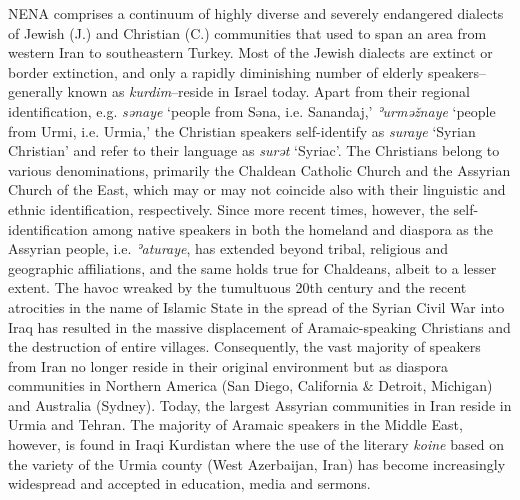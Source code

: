 \documentclass[output=paper,colorlinks,citecolor=brown,draftmode]{langscibook}
\begin{document}
NENA comprises a continuum of highly diverse and severely endangered dialects of Jewish (J.) and Christian (C.) communities that used to span an area from western Iran to southeastern Turkey. Most of the Jewish dialects are extinct or border extinction, and only a rapidly diminishing number of elderly speakers–generally known as \textit{kurdim}–reside in Israel today. Apart from their regional identification, e.g. \textit{sənaye} `people from Səna, i.e. Sanandaj,' \textit{ʾurməžnaye} `people from Urmi, i.e. Urmia,' the Christian speakers self-identify as \textit{suraye} `Syrian Christian' and refer to their language as \textit{surət} `Syriac'. The Christians belong to various denominations, primarily the Chaldean Catholic Church and the Assyrian Church of the East, which may or may not coincide also with their linguistic and ethnic identification, respectively. Since more recent times, however, the self-identification among  native speakers in both the homeland and diaspora as the Assyrian people, i.e. \textit{ʾaturaye}, has extended beyond tribal, religious and geographic affiliations, and the same holds true for Chaldeans, albeit to a lesser extent. The havoc wreaked by the tumultuous 20th century and the recent atrocities in the name of Islamic State in the spread of the Syrian Civil War into Iraq has resulted in the massive displacement of Aramaic-speaking Christians and the destruction of entire villages. Consequently, the vast majority of speakers from Iran no longer reside in their original environment but as diaspora communities in Northern America (San Diego, California \& Detroit, Michigan) and Australia (Sydney). Today, the largest Assyrian communities in Iran reside in Urmia and Tehran. The majority of Aramaic speakers in the Middle East, however, is found in Iraqi Kurdistan where the use of the literary \textit{koine} based on the variety of the Urmia county (West Azerbaijan, Iran) has become increasingly widespread and accepted in education, media and sermons. 
\end{document}

